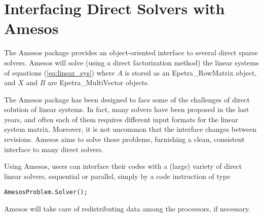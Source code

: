 % 
% 
% 
%  
%  
% 

\section{Interfacing Direct Solvers with Amesos}
\label{chap:amesos}

The Amesos package provides an object-oriented interface to several
direct sparse solvers. Amesos will solve (using a direct factorization
method) the linear systems of equations (\ref{eq:linear_sys}) where $A$
is stored as an Epetra\_RowMatrix object, and $X$ and $B$ are
Epetra\_MultiVector objects.

The Amesos package has been designed to face some of the challenges of
direct solution of linear systems. In fact, many solvers have been
proposed in the last years, and often each of them requires different
input formats for the linear system matrix. Moreover, it is not uncommon
that the interface changes between revisions. Amesos aims to solve those
problems, furnishing a clean, consistent interface to many direct
solvers.

Using Amesos, users can interface their codes with a (large) variety of
direct linear solvers, sequential or parallel, simply by a code
instruction of type
\begin{verbatim}
AmesosProblem.Solver();
\end{verbatim}
Amesos will take care of redistributing data among the processors, if
necessary.


